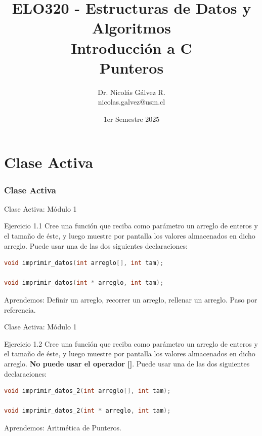 \documentclass{beamer}
\title{ELO320 - Estructuras de Datos y Algoritmos\\Introducción a C\\Punteros}
\author{Dr. Nicolás Gálvez R.\\{\small nicolas.galvez@usm.cl}}
\institute{Ing. Civil Telemática - Departamento de Electrónica}
\date{1er Semestre 2025}
\begin{document}
\frame{\titlepage}

%
%
\part{Clase Activa}
\section{Clase Activa}
\begin{frame}[fragile]{Clase Activa: Módulo 1}
\begin{exampleblock}{Ejercicio 1.1}
Cree una función que reciba como parámetro un arreglo de enteros y el tamaño de éste, y luego muestre por pantalla los valores almacenados en dicho arreglo. Puede usar una de las dos siguientes declaraciones:
\begin{lstlisting}[language=C, basicstyle=\scriptsize]
void imprimir_datos(int arreglo[], int tam);

void imprimir_datos(int * arreglo, int tam);
\end{lstlisting}
\end{exampleblock}

{\tiny Aprendemos: Definir un arreglo, recorrer un arreglo, rellenar un arreglo. Paso por referencia.}
\end{frame}

\begin{frame}[fragile]{Clase Activa: Módulo 1}
\begin{exampleblock}{Ejercicio 1.2}
Cree una función que reciba como parámetro un arreglo de enteros y el tamaño de éste, y luego muestre por pantalla los valores almacenados en dicho arreglo. \textbf{No puede usar el operador []}. Puede usar una de las dos siguientes declaraciones:
\begin{lstlisting}[language=C, basicstyle=\scriptsize]
void imprimir_datos_2(int arreglo[], int tam);

void imprimir_datos_2(int * arreglo, int tam);
\end{lstlisting}
\end{exampleblock}

{\tiny Aprendemos: Aritmética de Punteros.}
\end{frame}
\end{document}

